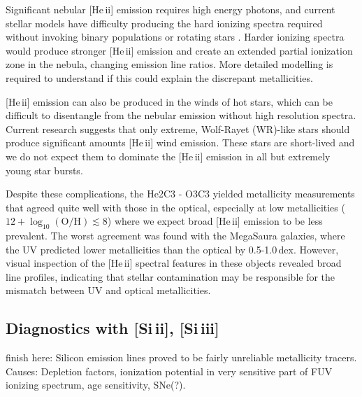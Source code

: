 \documentclass[preprint2]{aastex62}
\newcommand{\heii}{[He\,{\sc ii}]\xspace}
\newcommand{\SiuII}{[Si\,{\sc ii}]\xspace}
\newcommand{\SiuIII}{[Si\,{\sc iii}]\xspace}
\newcommand{\logten}{\ensuremath{\log_{10}}}
\newcommand{\logOH}{\ensuremath{\logten (\mathrm{O}/\mathrm{H})}\xspace}
\newcommand{\mage}{{\sc Meg}a{\sc S}a{\sc ura}\xspace}
\newcommand{\XXX}{{\bf \color{red}{XXX} }}
\begin{document}
Significant nebular \heii emission requires high energy photons, and current stellar models have difficulty producing the hard ionizing spectra required without invoking binary populations or rotating stars \citep[e.g.,][]{Stark+2014, Steidel+2016, Byler+2017}. Harder ionizing spectra would produce stronger \heii emission and create an extended partial ionization zone in the nebula, changing emission line ratios. More detailed modelling is required to understand if this could explain the discrepant metallicities.

\heii emission can also be produced in the winds of hot stars, which can be difficult to disentangle from the nebular emission without high resolution spectra. Current research suggests that only extreme, Wolf-Rayet (WR)-like stars should produce significant amounts \heii wind emission. These stars are short-lived and we do not expect them to dominate the \heii emission in all but extremely young star bursts.

Despite these complications, the He2C3 - O3C3 yielded metallicity measurements that agreed quite well with those in the optical, especially at low metallicities ($12+\logOH \lesssim 8$) where we expect broad \heii emission to be less prevalent. The worst agreement was found with the \mage galaxies, where the UV predicted lower metallicities than the optical by 0.5-1.0\,dex. However, visual inspection of the \heii spectral features in these objects revealed broad line profiles, indicating that stellar contamination may be responsible for the mismatch between UV and optical metallicities.

\subsection{Diagnostics with \SiuII, \SiuIII}

\XXX finish here: Silicon emission lines proved to be fairly unreliable metallicity tracers. Causes: Depletion factors, ionization potential in very sensitive part of FUV ionizing spectrum, age sensitivity, SNe(?).

\end{document}
